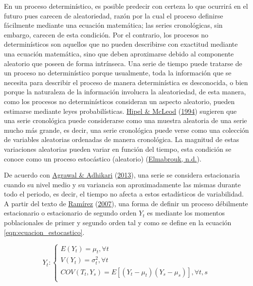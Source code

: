 \documentclass[
]{article}
\begin{document}
En un proceso determinístico, es posible predecir con certeza lo que
ocurrirá en el futuro pues carecen de aleatoriedad, razón por la cual el
proceso definirse fácilmente mediante una ecuación matemática; las
series cronológicas, sin embargo, carecen de esta condición. Por el
contrario, los procesos no determinísticos son aquellos que no pueden
describirse con exactitud mediante una ecuación matemática, sino que
deben aproximarse debido al componente aleatorio que poseen de forma
intrínseca. Una serie de tiempo puede tratarse de un proceso no
determinístico porque usualmente, toda la información que se necesita
para describir el proceso de manera determinística es desconocida, o
bien porque la naturaleza de la información involucra la aleatoriedad,
de esta manera, como los procesos no determinísticos consideran un
aspecto aleatorio, pueden estimarse mediante leyes probabilísticas.
\protect\hyperlink{ref-Hipel}{Hipel \& McLeod}
(\protect\hyperlink{ref-Hipel}{1994}) sugieren que una serie cronológica
puede considerarse como una muestra aleatoria de una serie mucho más
grande, es decir, una serie cronológica puede verse como una colección
de variables aleatorias ordenadas de manera cronológica. La magnitud de
estas variaciones aleatorias pueden variar en función del tiempo, esta
condición se conoce como un proceso estocástico (aleatorio)
(\protect\hyperlink{ref-definicion_estocastico}{Elmabrouk, n.d.}).

De acuerdo con \protect\hyperlink{ref-stationary_def}{Agrawal \&
Adhikari} (\protect\hyperlink{ref-stationary_def}{2013}), una serie se
considera estacionaria cuando su nivel medio y su variancia son
aproximadamente las mismas durante todo el periodo, es decir, el tiempo
no afecta a estos estadísticos de variabilidad. A partir del texto de
\protect\hyperlink{ref-introduccion_series}{Ramírez}
(\protect\hyperlink{ref-introduccion_series}{2007}), una forma de
definir un proceso débilmente estacionario o estacionario de segundo
orden \(Y_t\) es mediante los momentos poblacionales de primer y segundo
orden tal y como se define en la ecuación
\ref{eqn:ecuacion_estocastico}.

\begin{equation}
\label{eqn:ecuacion_estocastico}
Y_t:
\begin{cases}
E(Y_t) = \mu_t, \forall t \\
V(Y_t) = \sigma^2_t, \forall t \\
COV(T_t,Y_s) = E\left[(Y_t-\mu_t)(Y_s-\mu_s)\right], \forall t,s \\
\end{cases}
\end{equation}
\end{document}
